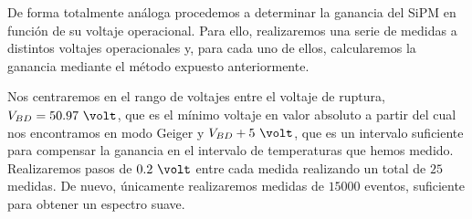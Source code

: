 De forma totalmente análoga procedemos a determinar la ganancia del SiPM en función de su voltaje operacional. Para ello, realizaremos una serie de medidas a distintos voltajes operacionales y, para cada uno de ellos, calcularemos la ganancia mediante el método expuesto anteriormente. 

Nos centraremos en el rango de voltajes entre el voltaje de ruptura, $V_{BD}= 50.97~\volt$, que es el mínimo voltaje en valor absoluto a partir del cual nos encontramos en modo Geiger y $V_{BD}+5~\volt$, que es un intervalo suficiente para compensar la ganancia en el intervalo de temperaturas que hemos medido. Realizaremos pasos de $0.2~\volt$ entre cada medida realizando un total de $25$ medidas. De nuevo, únicamente realizaremos medidas de $15000$ eventos, suficiente para obtener un espectro  suave.

